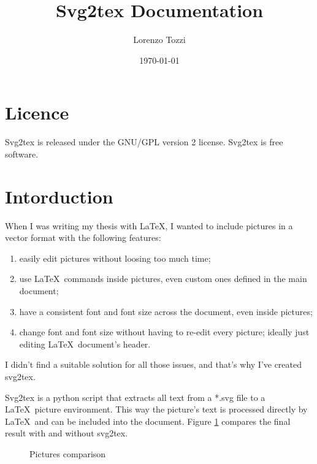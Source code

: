 \documentclass[a4paper,12pt]{article}
\begin{document}
\title{Svg2tex Documentation}

\author{Lorenzo Tozzi}
\date{\today}
\maketitle

\tableofcontents

\section{Licence}

Svg2tex is released under the GNU/GPL version 2 license. Svg2tex is free software.

\section{Intorduction}

When I was writing my thesis with \LaTeX , I wanted to include pictures in a vector format with the following features:
\begin{enumerate}
  \item easily edit pictures without loosing too much time;
  \item use \LaTeX\ commands inside pictures, even custom ones defined in the main document;
  \item have a consistent font and font size across the document, even inside pictures;
  \item change font and font size without having to re-edit every picture; ideally just editing \LaTeX\ document's header.
\end{enumerate}
I didn't find a suitable solution for all those issues, and that's why I've created svg2tex.

Svg2tex is a python script that extracts all text from a *.svg file to a \LaTeX\ picture environment. This way the picture's text is processed directly by \LaTeX\ and can be included into the document. Figure \ref{fig:comparison} compares the final result with and without svg2tex.
\begin{figure}[tb]
  \centering
  \caption{Pictures comparison}
  \label{fig:comparison}
\end{figure}
\end{document}
